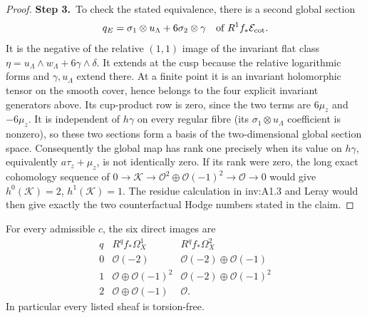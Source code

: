 \begin{proof}
\par\smallskip\noindent\textbf{Step 3.}\ To check the stated equivalence, there is a second global section
\[
q_E=\sigma_1\otimes u_{\Lambda}+6\sigma_2\otimes\gamma
\quad\text{of }R^1f_*\mathcal E_{\rm cot}.
\]
It is the negative of the relative $(1,1)$ image of the invariant
flat class $\eta=u_{\Lambda}\wedge w_{\Lambda}+6\gamma\wedge\delta$.
It extends at the cusp because the relative logarithmic forms and
$\gamma,u_{\Lambda}$ extend there.  At a finite point it is an invariant
holomorphic tensor on the smooth cover, hence belongs to the four
explicit invariant generators above.  Its cup-product row is zero,
since the two terms are $6\mu_z$ and $-6\mu_z$.
It is independent of $h\gamma$ on every regular fibre (its
$\sigma_1\otimes u_{\Lambda}$ coefficient is nonzero), so these two sections
form a basis of the two-dimensional global section space.
Consequently the global map has rank one precisely when its value
on $h\gamma$, equivalently $a\tau_z+\mu_z$, is not identically
zero.  If its rank were zero, the long exact cohomology sequence of
$0\to\mathcal K\to\mathcal O^2\oplus\mathcal O(-1)^2\to\mathcal O\to0$
would give $h^0(\mathcal K)=2$, $h^1(\mathcal K)=1$.
The residue calculation in inv:A1.3 and Leray would then give exactly
the two counterfactual Hodge numbers stated in the claim.
\end{proof}

\begin{theorem}\label{inv:A1.3}
For every admissible $c$, the six direct images are
\begin{equation}\label{inv:eq:A-absolute-table}
\begin{array}{c|cc}
q&R^qf_*\Omega_X^1&R^qf_*\Omega_X^2\\\hline
0&\mathcal O(-2)&\mathcal O(-2)\oplus\mathcal O(-1)\\
1&\mathcal O\oplus\mathcal O(-1)^2&\mathcal O(-2)\oplus\mathcal O(-1)^2\\
2&\mathcal O\oplus\mathcal O(-1)&\mathcal O.
\end{array}
\end{equation}
In particular every listed sheaf is torsion-free.
\end{theorem}

